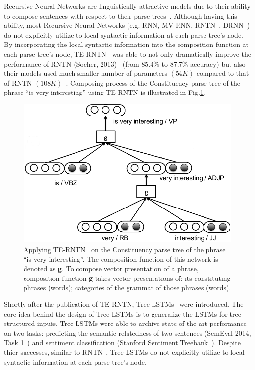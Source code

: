 Recursive Neural Networks are linguistically attractive models due to their ability to compose sentences with respect to their parse trees~\cite{treeLSTM}.
Although having this ability, most Recursive Neural Networks (e.g. RNN, MV-RNN, RNTN~\cite{socher2013recursive}, DRNN~\cite{IrsoyDRNN}) do not explicitly utilize to local syntactic information at each parse tree's node.
By incorporating the local syntactic information into the composition function at each parse tree's node, TE-RNTN~\cite{tag-embedding-rnn} was able to not only dramatically improve the performance of RNTN (Socher, 2013)~\cite{socher2013recursive} (from \(85.4\%\) to \(87.7\%\) accuracy) but also their models used much smaller number of parameters \((54K)\) compared to that of RNTN \((108K)\)~\cite{tag-embedding-rnn}.
Composing process of the Constituency parse tree of the phrase ``is very interesting'' using TE-RNTN is illustrated in Fig.\ref{fig:example-compose-tag}.

\begin{figure}[H]
    \centering
    \includegraphics[scale=0.4]{figure/example-compose-tag}
    \caption[Applying TE-RNTN on the phrase ``is very interesting'']{Applying TE-RNTN~\cite{tag-embedding-rnn} on the Constituency parse tree of the phrase ``is very interesting''.
    The composition function of this network is denoted as \textbf{g}.
    To compose vector presentation of a phrase, composition function \textbf{g} takes vector presentations of: its constituting phrases (words); categories of the grammar of those phrases (words).}
    \label{fig:example-compose-tag}
\end{figure}

Shortly after the publication of TE-RNTN, Tree-LSTMs~\cite{treeLSTM} were introduced.
The core idea behind the design of Tree-LSTMs is to generalize the LSTMs for tree-structured inputs.
Tree-LSTMs were able to archive state-of-the-art performance on two tasks: predicting the semantic relatedness of two sentences (SemEval 2014, Task 1~\cite{SemeEvalTask1}) and sentiment classification (Stanford Sentiment Treebank~\cite{socher2013recursive}).
Despite thier successes, similar to RNTN~\cite{socher2013recursive}, Tree-LSTMs do not explicitly utilize to local syntactic information at each parse tree's node.

